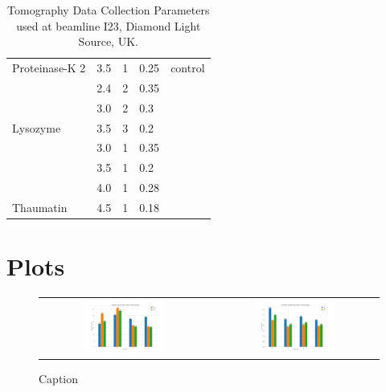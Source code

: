 \begin{table}[]
{\begin{tabular}{@{}lllll@{}}
\multirow{-2}{*}{Proteinase-K 2} & 3.5    & 1             & 0.25                          & \multirow{-2}{*}{control}      \\
                                 & 2.4    & 2             & 0.35                          &                                \\
                                 & 3.0    & 2             & 0.3                           &                                \\
\multirow{-3}{*}{Lysozyme}       & 3.5    & 3             & 0.2                           &                                \\
                                 & 3.0    & 1             & 0.35                          &                                \\
                                 & 3.5    & 1             & 0.2                           &                                \\
                                 & 4.0    & 1             & 0.28                          &                                \\
\multirow{-4}{*}{Thaumatin}      & 4.5    & 1             & 0.18                          &       \\
\bottomrule
\end{tabular}%
}

\caption{Tomography Data Collection Parameters used at beamline I23, Diamond Light Source, UK.}
\label{tomo_table}
\end{table}


\newpage
\section{Plots}

\begin{figure}[h]
    \centering
    \begin{tabular}{cc}
    \includegraphics[width = 0.5\textwidth]{plots/exp1/thaum_1/I_over_sigma.png} & \includegraphics[width = 0.5\textwidth]{plots/exp1/thaum_1/rmerges.png}
    \end{tabular}
    \caption{Caption}
    \label{fig:thaum1_Isig}
\end{figure}
